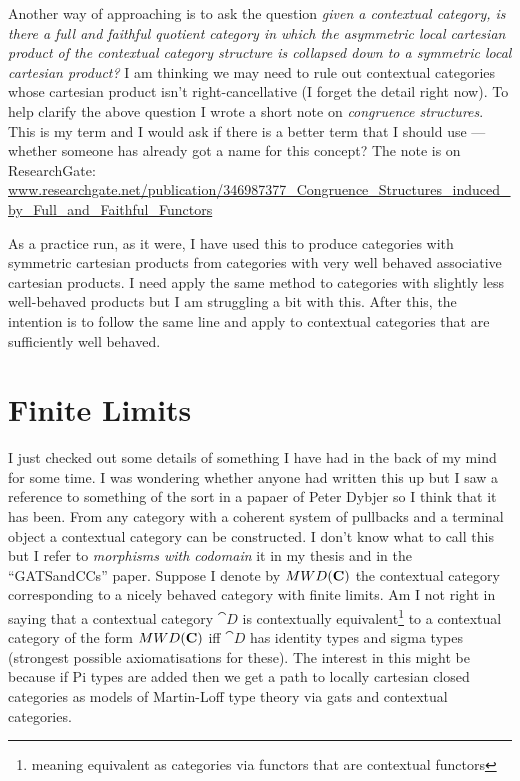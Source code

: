 \documentclass[10pt,a4paper]{article}
\theoremstyle{remark}
\newcommand{\myurl}[1]{{\footnotesize \url{#1}}}
\begin{document}
\note Another way of approaching is to ask the question \textit{ given a contextual category, is there a full and faithful quotient category in which the asymmetric local cartesian product of the contextual category structure is collapsed down to a symmetric local cartesian product?} I am thinking we may need to rule out contextual categories whose 
cartesian product isn't right-cancellative (I forget the detail right now). 
\note
To help clarify the above question I wrote a short note on \textit{congruence structures}.  This is my term and I would ask if there is a better term that I should use --- whether someone has already got a  name for this concept? The note is on ResearchGate: \\
\myurl{www.researchgate.net/publication/346987377_Congruence_Structures_induced_by_Full_and_Faithful_Functors}

As a practice run, as it were, I have used this to produce categories with symmetric cartesian products from categories with very well behaved associative cartesian products. I need apply the same method to categories with slightly less well-behaved products but I am struggling a bit with this. After this, the intention is to follow the same line and apply to contextual categories that are sufficiently well behaved.

\section{Finite Limits}
\note 
I just checked out some details of something I have had in the back of my mind for some time. 
I was wondering whether anyone had written this up but I saw a reference to something of the sort in a papaer of Peter Dybjer so I think that it  has been.
 From any category with a coherent system of pullbacks and a terminal object a contextual category can be constructed. I don't know what to call this but 
I refer to \textit{morphisms with codomain} it in my thesis and in the ``GATSandCCs'' paper.
Suppose I denote by $MWD(\textbf{C})$ the contextual category corresponding to a nicely behaved category \catcw with finite limits. Am I not right in saying that a contextual category $\cat{D}$ is contextually equivalent\footnote{meaning equivalent as categories via functors that are contextual functors} to 
a contextual category of the form $MWD(\textbf{C})$ iff $\cat{D}$ has identity types and sigma types
(strongest possible axiomatisations for these). The interest in this might be because if Pi types are added then we get  a path to locally cartesian closed categories as models of Martin-Loff type theory via gats and contextual categories. 
\end{document}
